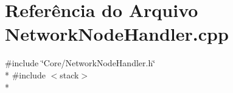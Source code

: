 \section{Referência do Arquivo Network\+Node\+Handler.\+cpp}
\label{_network_node_handler_8cpp}
{\ttfamily \#include \char`\"{}Core/\+Network\+Node\+Handler.\+h\char`\"{}}\\*
{\ttfamily \#include $<$stack$>$}\\*
